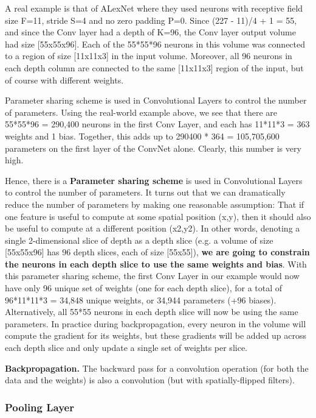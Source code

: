 \documentclass[letterpaper]{article}
\begin{document}
A real example is that of ALexNet where they used neurons with receptive field size F=11, stride S=4 and no zero padding P=0. Since (227 - 11)/4 + 1 = 55, and since the Conv layer had a depth of K=96, the Conv layer output volume had size [55x55x96]. Each of the 55*55*96 neurons in this volume was connected to a region of size [11x11x3] in the input volume. Moreover, all 96 neurons in each depth column are connected to the same [11x11x3] region of the input, but of course with different weights.

Parameter sharing scheme is used in Convolutional Layers to control the number of parameters. Using the real-world example above, we see that there are 55*55*96 = 290,400 neurons in the first Conv Layer, and each has 11*11*3 = 363 weights and 1 bias. Together, this adds up to 290400 * 364 = 105,705,600 parameters on the first layer of the ConvNet alone. Clearly, this number is very high.

Hence, there is a \textbf{Parameter sharing scheme} is used in Convolutional Layers to control the number of parameters. It turns out that we can dramatically reduce the number of parameters by making one reasonable assumption: That if one feature is useful to compute at some spatial position (x,y), then it should also be useful to compute at a different position (x2,y2). In other words, denoting a single 2-dimensional slice of depth as a depth slice (e.g. a volume of size [55x55x96] has 96 depth slices, each of size [55x55]), \textbf{we are going to constrain the neurons in each depth slice to use the same weights and bias}. With this parameter sharing scheme, the first Conv Layer in our example would now have only 96 unique set of weights (one for each depth slice), for a total of 96*11*11*3 = 34,848 unique weights, or 34,944 parameters (+96 biases). Alternatively, all 55*55 neurons in each depth slice will now be using the same parameters. In practice during backpropagation, every neuron in the volume will compute the gradient for its weights, but these gradients will be added up across each depth slice and only update a single set of weights per slice.

\textbf{Backpropagation. }The backward pass for a convolution operation (for both the data and the weights) is also a convolution (but with spatially-flipped filters).

\subsubsection{Pooling Layer}
\end{document}
